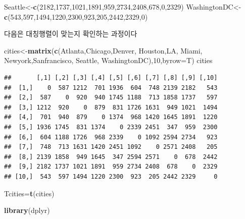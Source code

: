 \documentclass[]{article}
\newenvironment{Shaded}{\begin{snugshade}}{\end{snugshade}}
\newcommand{\KeywordTok}[1]{\textcolor[rgb]{0.13,0.29,0.53}{\textbf{{#1}}}}
\newcommand{\DataTypeTok}[1]{\textcolor[rgb]{0.13,0.29,0.53}{{#1}}}
\newcommand{\DecValTok}[1]{\textcolor[rgb]{0.00,0.00,0.81}{{#1}}}
\newcommand{\NormalTok}[1]{{#1}}
\begin{document}
\begin{Shaded}
\begin{Highlighting}[]
\NormalTok{Seattle<-}\KeywordTok{c}\NormalTok{(}\DecValTok{2182}\NormalTok{,}\DecValTok{1737}\NormalTok{,}\DecValTok{1021}\NormalTok{,}\DecValTok{1891}\NormalTok{,}\DecValTok{959}\NormalTok{,}\DecValTok{2734}\NormalTok{,}\DecValTok{2408}\NormalTok{,}\DecValTok{678}\NormalTok{,}\DecValTok{0}\NormalTok{,}\DecValTok{2329}\NormalTok{)}
\NormalTok{WashingtonDC<-}\KeywordTok{c}\NormalTok{(}\DecValTok{543}\NormalTok{,}\DecValTok{597}\NormalTok{,}\DecValTok{1494}\NormalTok{,}\DecValTok{1220}\NormalTok{,}\DecValTok{2300}\NormalTok{,}\DecValTok{923}\NormalTok{,}\DecValTok{205}\NormalTok{,}\DecValTok{2442}\NormalTok{,}\DecValTok{2329}\NormalTok{,}\DecValTok{0}\NormalTok{)}
\end{Highlighting}
\end{Shaded}

다음은 대칭행렬이 맞는지 확인하는 과정이다

\begin{Shaded}
\begin{Highlighting}[]
\NormalTok{cities<-}\KeywordTok{matrix}\NormalTok{(}\KeywordTok{c}\NormalTok{(Atlanta,Chicago,Denver, Houston,LA, Miami, Newyork,Sanfrancisco, Seattle, WashingtonDC),}\DecValTok{10}\NormalTok{,}\DataTypeTok{byrow=}\NormalTok{T)}
\NormalTok{cities}
\end{Highlighting}
\end{Shaded}

\begin{verbatim}
##       [,1] [,2] [,3] [,4] [,5] [,6] [,7] [,8] [,9] [,10]
##  [1,]    0  587 1212  701 1936  604  748 2139 2182   543
##  [2,]  587    0  920  940 1745 1188  713 1858 1737   597
##  [3,] 1212  920    0  879  831 1726 1631  949 1021  1494
##  [4,]  701  940  879    0 1374  968 1420 1645 1891  1220
##  [5,] 1936 1745  831 1374    0 2339 2451  347  959  2300
##  [6,]  604 1188 1726  968 2339    0 1092 2594 2734   923
##  [7,]  748  713 1631 1420 2451 1092    0 2571 2408   205
##  [8,] 2139 1858  949 1645  347 2594 2571    0  678  2442
##  [9,] 2182 1737 1021 1891  959 2734 2408  678    0  2329
## [10,]  543  597 1494 1220 2300  923  205 2442 2329     0
\end{verbatim}

\begin{Shaded}
\begin{Highlighting}[]
\NormalTok{Tcities=}\KeywordTok{t}\NormalTok{(cities)}

\KeywordTok{library}\NormalTok{(dplyr)}
\end{Highlighting}
\end{Shaded}
\end{document}
